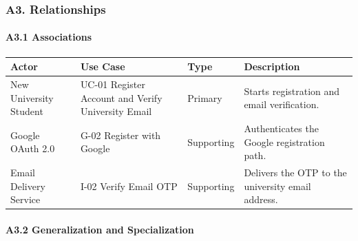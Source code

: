 \documentclass[12pt]{article}
\renewcommand{\baselinestretch}{1.5}
\begin{document}
\hypertarget{sec:a3-relationships}{}
\subsubsection*{A3. Relationships}
\par\medskip

\hypertarget{sec:a3-1-associations}{}
\paragraph*{A3.1 Associations}
\par\medskip

\begingroup
\small
\renewcommand{\baselinestretch}{1.0}\selectfont
\renewcommand{\arraystretch}{1.15}
\setlength{\tabcolsep}{6pt}
\begin{longtable}{|>{\raggedright\arraybackslash}p{}|>{\raggedright\arraybackslash}p{}|>{\raggedright\arraybackslash}p{}|>{\raggedright\arraybackslash}p{}|}
\hline
\textbf{Actor} & \textbf{Use Case} & \textbf{Type} & \textbf{Description} \\ \hline
\endhead
New University Student & UC-01 Register Account and Verify University Email & Primary & Starts registration and email verification. \\ \hline
Google OAuth 2.0 & G-02 Register with Google & Supporting & Authenticates the Google registration path. \\ \hline
Email Delivery Service & I-02 Verify Email OTP & Supporting & Delivers the OTP to the university email address. \\ \hline
\end{longtable}
\endgroup
\par\medskip

\hypertarget{sec:a3-2-generalization-and-specialization}{}
\paragraph*{A3.2 Generalization and Specialization}
\par\medskip
\end{document}

